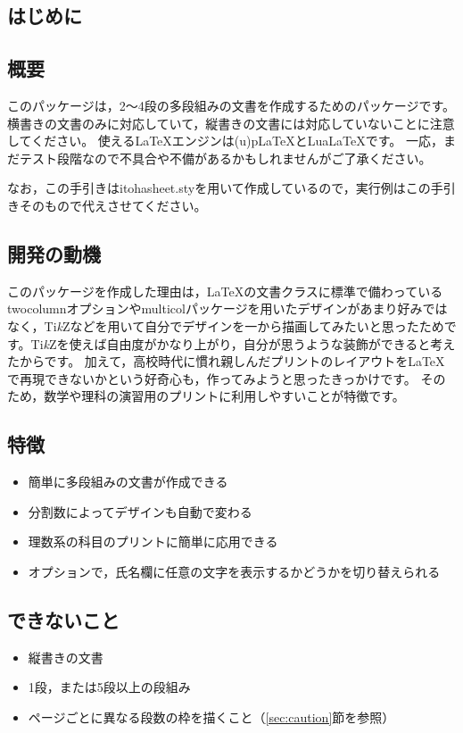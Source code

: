 \documentclass[fontsize=9pt]{jlreq}
\newcommand{\pkgname}{itohasheet}
\newcommand{\pkg}[1]{\textsf{#1}}
\begin{document}
\begin{分割}

\section{はじめに}
\subsection{概要}
このパッケージは，2〜4段の多段組みの文書を作成するためのパッケージです。
横書きの文書のみに対応していて，縦書きの文書には対応していないことに注意してください。
使える\LaTeX{}エンジンは(u)p\LaTeX{}とLua\LaTeX{}です。
一応，まだテスト段階なので不具合や不備があるかもしれませんがご了承ください。

なお，この手引きは\pkg{\pkgname.sty}を用いて作成しているので，実行例はこの手引きそのもので代えさせてください。

\subsection{開発の動機}
このパッケージを作成した理由は，\LaTeX{}の文書クラスに標準で備わっているtwocolumnオプションやmulticolパッケージを用いたデザインがあまり好みではなく，Ti\textit{k}Zなどを用いて自分でデザインを一から描画してみたいと思ったためです。Ti\textit{k}Zを使えば自由度がかなり上がり，自分が思うような装飾ができると考えたからです。
加えて，高校時代に慣れ親しんだプリントのレイアウトを\LaTeX{}で再現できないかという好奇心も，作ってみようと思ったきっかけです。
そのため，数学や理科の演習用のプリントに利用しやすいことが特徴です。

\subsection{特徴}
\begin{itemize}
  \item 簡単に多段組みの文書が作成できる
  \item 分割数によってデザインも自動で変わる
  \item 理数系の科目のプリントに簡単に応用できる
  \item オプションで，氏名欄に任意の文字を表示するかどうかを切り替えられる
\end{itemize}

\subsection{できないこと}
\begin{itemize}
  \item 縦書きの文書
  \item 1段，または5段以上の段組み
  \item ページごとに異なる段数の枠を描くこと（\ref{sec:caution}節を参照）
\end{itemize}



\end{分割}
\end{document}
